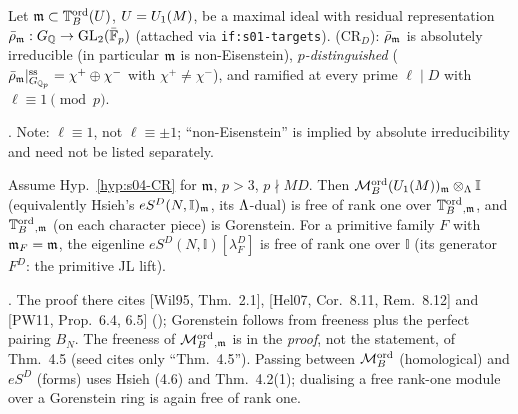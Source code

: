 \begin{hypothesis}\label{hyp:s04-CR}
Let $\mathfrak{m}\subset\mathbb{T}^{\mathrm{ord}}_B(U)$, $U=U_1(M)$, be a maximal ideal with residual representation $\bar\rho_{\mathfrak{m}}:G_{\mathbb{Q}}\to\mathrm{GL}_2(\bar{\mathbb{F}}_p)$
(attached via \texttt{if:s01-targets}). (CR$_D$): $\bar\rho_{\mathfrak{m}}$ is absolutely irreducible (in particular $\mathfrak{m}$ is non-Eisenstein),
\emph{$p$-distinguished} ($\bar\rho_{\mathfrak{m}}|_{G_{\mathbb{Q}_p}}^{\rm ss}=\chi^+\oplus\chi^-$ with $\chi^+\ne\chi^-$), and ramified at every prime
$\ell\mid D$ with $\ell\equiv1\pmod p$.
\end{hypothesis}
\noindent\stcited{} . Note: $\ell\equiv1$, not $\ell\equiv\pm1$; ``non-Eisenstein'' is implied by
absolute irreducibility and need not be listed separately.

\begin{theorem}\label{thm:s04-Gor}
Assume Hyp.~\ref{hyp:s04-CR} for $\mathfrak{m}$, $p>3$, $p\nmid MD$. Then $\mathcal{M}^{\mathrm{ord}}_B(U_1(M))_{\mathfrak{m}}\otimes_\Lambda\mathbb I$ (equivalently Hsieh's
$eS^D(N,\mathbb I)_{\mathfrak{m}}$, its $\Lambda$-dual) is free of rank one over $\mathbb{T}^{\mathrm{ord}}_B{}_{,\mathfrak{m}}$, and $\mathbb{T}^{\mathrm{ord}}_B{}_{,\mathfrak{m}}$ (on each character piece) is
Gorenstein. For a primitive family $F$ with $\mathfrak{m}_F=\mathfrak{m}$, the eigenline $eS^D(N,\mathbb I)[\lambda^D_F]$ is free of rank one over
$\mathbb I$ (its generator $F^D$: the primitive JL lift).
\end{theorem}
\noindent\stcited{} .
The proof there cites [Wil95, Thm.~2.1], [Hel07, Cor.~8.11, Rem.~8.12] and [PW11, Prop.~6.4, 6.5]
(); Gorenstein
follows from freeness plus the perfect pairing $B_N$. The freeness of $\mathcal{M}^{\mathrm{ord}}_B{}_{,\mathfrak{m}}$ is in the \emph{proof}, not the statement, of
Thm.~4.5 (seed cites only ``Thm.~4.5''). Passing between $\mathcal{M}^{\mathrm{ord}}_B$ (homological) and $eS^D$ (forms) uses Hsieh (4.6) and
Thm.~4.2(1); dualising a free rank-one module over a Gorenstein ring is again free of rank one.

